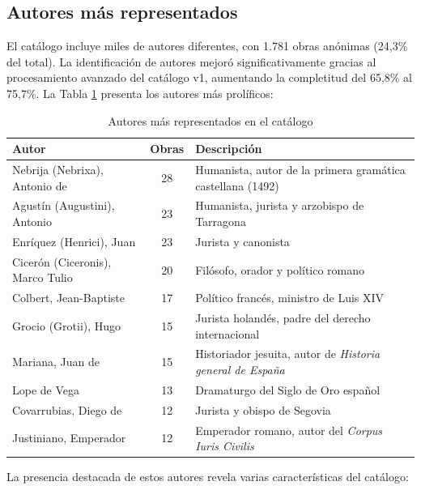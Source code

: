 \documentclass[12pt,a4paper]{article}
\begin{document}
\subsection{Autores más representados}

El catálogo incluye miles de autores diferentes, con 1.781 obras anónimas (24,3\% del total). La identificación de autores mejoró significativamente gracias al procesamiento avanzado del catálogo v1, aumentando la completitud del 65,8\% al 75,7\%. La Tabla \ref{tab:autores} presenta los autores más prolíficos:

\begin{table}[h]
\centering
\caption{Autores más representados en el catálogo}
\label{tab:autores}
\begin{tabular}{lcp{8cm}}
\toprule
\textbf{Autor} & \textbf{Obras} & \textbf{Descripción} \\
\midrule
Nebrija (Nebrixa), Antonio de & 28 & Humanista, autor de la primera gramática castellana (1492) \\
Agustín (Augustini), Antonio & 23 & Humanista, jurista y arzobispo de Tarragona \\
Enríquez (Henrici), Juan & 23 & Jurista y canonista \\
Cicerón (Ciceronis), Marco Tulio & 20 & Filósofo, orador y político romano \\
Colbert, Jean-Baptiste & 17 & Político francés, ministro de Luis XIV \\
Grocio (Grotii), Hugo & 15 & Jurista holandés, padre del derecho internacional \\
Mariana, Juan de & 15 & Historiador jesuita, autor de \textit{Historia general de España} \\
Lope de Vega & 13 & Dramaturgo del Siglo de Oro español \\
Covarrubias, Diego de & 12 & Jurista y obispo de Segovia \\
Justiniano, Emperador & 12 & Emperador romano, autor del \textit{Corpus Iuris Civilis} \\
\bottomrule
\end{tabular}
\end{table}

La presencia destacada de estos autores revela varias características del catálogo:
\end{document}
